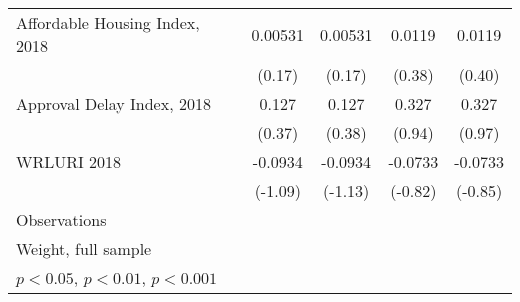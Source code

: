 \begin{table}[htbp]
\begin{tabular}{l*{4}{c}}
\addlinespace
Affordable Housing Index, 2018&     0.00531         &     0.00531         &      0.0119         &      0.0119         \\
                    &      (0.17)         &      (0.17)         &      (0.38)         &      (0.40)         \\
\addlinespace
Approval Delay Index, 2018&       0.127         &       0.127         &       0.327         &       0.327         \\
                    &      (0.37)         &      (0.38)         &      (0.94)         &      (0.97)         \\
\addlinespace
WRLURI 2018         &     -0.0934         &     -0.0934         &     -0.0733         &     -0.0733         \\
                    &     (-1.09)         &     (-1.13)         &     (-0.82)         &     (-0.85)         \\
\midrule
Observations        &                     &                     &                     &                     \\
\bottomrule
\multicolumn{5}{l}{\footnotesize Weight, full sample}\\
\multicolumn{5}{l}{\footnotesize \sym{*} \(p<0.05\), \sym{**} \(p<0.01\), \sym{***} \(p<0.001\)}\\
\end{tabular}
\end{table}
